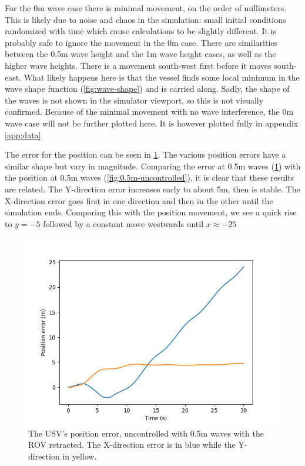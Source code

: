 \documentclass[class=article, crop=false]{standalone}
\begin{document}
For the 0m wave case there is minimal movement, on the order of millimeters. This is likely due to noise and chaos in the simulation: small initial conditions randomized with time which cause calculations to be slightly different. It is probably safe to ignore the movement in the 0m case. There are similarities between the 0.5m wave height and the 1m wave height cases, as well as the higher wave heights. There is a movement south-west first before it moves south-east. What likely happens here is that the vessel finds some local minimum in the wave shape function (\cref{fig:wave-shape}) and is carried along. Sadly, the shape of the waves is not shown in the simulator viewport, so this is not visually confirmed. Because of the minimal movement with no wave interference, the 0m wave case will not be further plotted here. It is however plotted fully in appendix \cref{app:data}.

The error for the position can be seen in \cref{fig:position_errors}. The various position errors have a similar shape but vary in magnitude. Comparing the error at 0.5m waves (\cref{fig:position_errors}) with the position at 0.5m waves (\cref{fig:0.5m-uncontrolled}), it is clear that these results are related. The Y-direction error increases early to about 5m, then is stable. The X-direction error goes first in one direction and then in the other until the simulation ends. Comparing this with the position movement, we see a quick rise to \(y=-5\) followed by a constant  move westwards until \(x\approx -25\)

\begin{figure}
    \centering
    \includegraphics{scenario1/rov-0m/0.5m/usv_pos_error_uncontrolled}
    \caption{The USV's position error, uncontrolled with 0.5m waves with the ROV retracted. The X-direction error is in blue while the Y-direction in yellow.}
    \label{fig:position_errors}
\end{figure}
\end{document}
